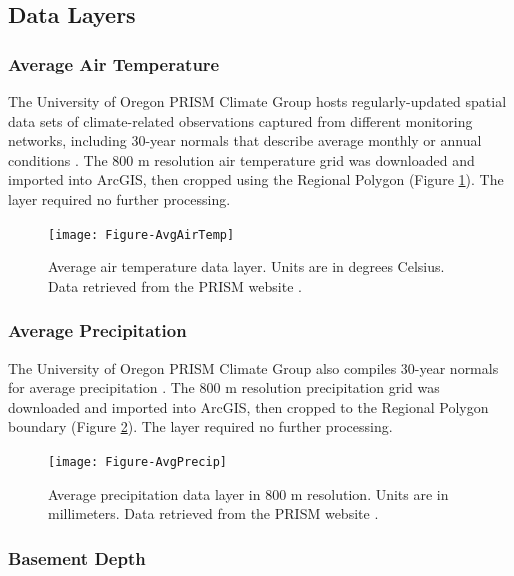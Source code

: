 \subsection{Data Layers}

\subsubsection{Average Air Temperature}

The University of Oregon PRISM Climate Group hosts regularly-updated spatial data sets of climate-related observations captured from different monitoring networks, including 30-year normals that describe average monthly or annual conditions \citep{daly_physiographically_2008, prism_prism_2021}. The 800 m resolution air temperature grid was downloaded and imported into ArcGIS, then cropped using the Regional Polygon (Figure \ref{fig:feat_airtemp}). The layer required no further processing.

\begin{figure}[!htp]
\centering
\texttt{[image: Figure-AvgAirTemp]}
\caption[Average air temperature data layer]{Average air temperature data layer. Units are in degrees Celsius. Data retrieved from the PRISM website \protect\citep{prism_prism_2021}.}
\label{fig:feat_airtemp}
\end{figure}

\subsubsection{Average Precipitation}

The University of Oregon PRISM Climate Group also compiles 30-year normals for average precipitation \citep{daly_physiographically_2008, prism_prism_2021}. The 800 m resolution precipitation grid was downloaded and imported into ArcGIS, then cropped to the Regional Polygon boundary (Figure \ref{fig:feat_precip}). The layer required no further processing.

\begin{figure}[!htp]
\centering
\texttt{[image: Figure-AvgPrecip]}
\caption[Average precipitation data layer]{Average precipitation data layer in 800 m resolution. Units are in millimeters. Data retrieved from the PRISM website \protect\citep{prism_prism_2021}.}
\label{fig:feat_precip}
\end{figure}

\subsubsection{Basement Depth}


